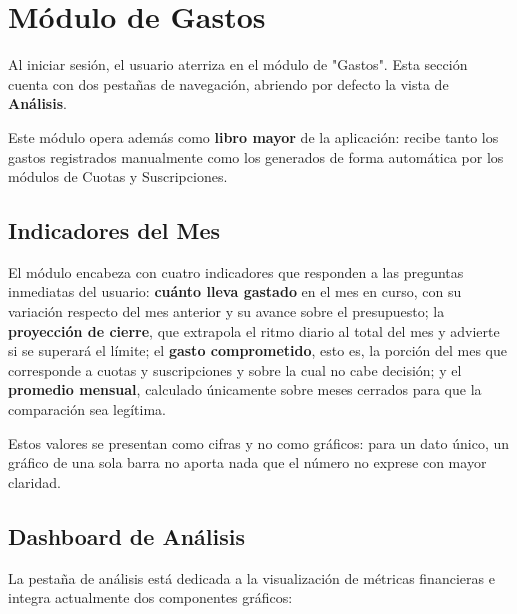 \section{Módulo de Gastos}
Al iniciar sesión, el usuario aterriza en el módulo de "Gastos". Esta sección cuenta con dos pestañas de navegación, abriendo por defecto la vista de \textbf{Análisis}.

Este módulo opera además como \textbf{libro mayor} de la aplicación: recibe tanto los gastos registrados manualmente como los generados de forma automática por los módulos de Cuotas y Suscripciones.

\subsection{Indicadores del Mes}
El módulo encabeza con cuatro indicadores que responden a las preguntas inmediatas del usuario: \textbf{cuánto lleva gastado} en el mes en curso, con su variación respecto del mes anterior y su avance sobre el presupuesto; la \textbf{proyección de cierre}, que extrapola el ritmo diario al total del mes y advierte si se superará el límite; el \textbf{gasto comprometido}, esto es, la porción del mes que corresponde a cuotas y suscripciones y sobre la cual no cabe decisión; y el \textbf{promedio mensual}, calculado únicamente sobre meses cerrados para que la comparación sea legítima.

Estos valores se presentan como cifras y no como gráficos: para un dato único, un gráfico de una sola barra no aporta nada que el número no exprese con mayor claridad.

\subsection{Dashboard de Análisis}
La pestaña de análisis está dedicada a la visualización de métricas financieras e integra actualmente dos componentes gráficos:

